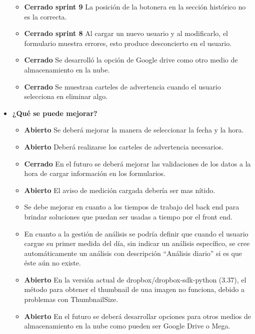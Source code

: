 \begin{itemize}
\begin{itemize}
 			\item \textbf{Cerrado sprint 9} La posición de la botonera en la sección histórico no es la correcta.		         										
 			\item \textbf{Cerrado sprint 8} Al cargar un nuevo usuario y al modificarlo, el formulario muestra errores, esto produce desconcierto en el usuario.
		        \item \textbf{Cerrado} Se desarrolló la opción de Google drive como otro medio de almacenamiento en la nube.
		        \item \textbf{Cerrado } Se muestran carteles de advertencia cuando el usuario selecciona en eliminar algo.
 		\end{itemize}
 		
 		\item \textbf{¿Qué se puede mejorar?}
 		\begin{itemize}
 
 			\item \textbf{Abierto} Se deberá mejorar la manera de seleccionar la fecha y la hora.
 			\item \textbf{Abierto} Deberá realizarse los carteles de advertencia necesarios.
		    \item \textbf{Cerrado} En el futuro se deberá mejorar las validaciones de los datos a la hora de cargar información en los formularios. 
			 \item \textbf{Abierto}  El aviso de medición cargada debería ser mas nítido.
			 \item Se debe mejorar en cuanto a los tiempos de trabajo del back end para brindar soluciones que puedan ser usadas a tiempo por el front end.
			 \item En cuanto a la gestión de análisis se podría definir que cuando el usuario cargue su primer medida del día, sin indicar un análisis específico, se cree automáticamente un análisis con descripción ``Análisis diario'' si es que éste aún no existe.	
	          \item \textbf{Abierto} En la versión actual de dropbox/dropbox-sdk-python (3.37), el método para obtener el thumbnail de una imagen no funciona, debido a problemas con ThumbnailSize.			 		 		    
		        \item \textbf{Abierto} En el futuro se deberá desarrollar opciones para otros medios de almacenamiento en la nube como pueden ser Google Drive o Mega.	          
 		\end{itemize}
 		
 		
 	\end{itemize}